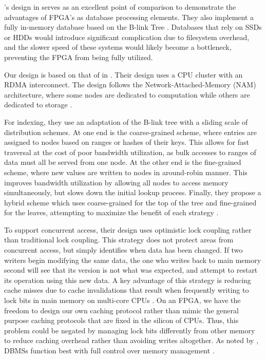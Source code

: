

\citeauthor{base}'s design in  serves as an excellent point of
comparison to demonstrate the advantages of FPGA's as database processing
elements. They also implement a fully in-memory database based on the B-link
Tree \autocite{base}. Databases that rely on SSDs or HDDs would introduce
significant complication due to filesystem overhead, and the slower speed of
these systems would likely become a bottleneck, preventing the FPGA from being
fully utilized.

Our design is based on that of \citeauthor{base} in . Their
design uses a CPU cluster with an RDMA interconnect. The design follows the
Network-Attached-Memory (NAM) architecture, where some nodes are dedicated to
computation while others are dedicated to storage
\autocite{base,binnig-vldb-2016}.

For indexing, they use an adaptation of the B-link tree with a sliding scale of
distribution schemes. At one end is the coarse-grained scheme, where entries are
assigned to nodes based on ranges or hashes of their keys. This allows for fast
traversal at the cost of poor bandwidth utilization, as bulk accesses to ranges
of data must all be served from one node. At the other end is the fine-grained
scheme, where new values are written to nodes in around-robin manner. This
improves bandwidth utilization by allowing all nodes to access memory
simultaneously, but slows down the initial lookup process. Finally, they propose
a hybrid scheme which uses coarse-grained for the top of the tree and
fine-grained for the leaves, attempting to maximize the benefit of each strategy
\autocite{base}.

To support concurrent access, their design uses optimistic lock coupling rather
than traditional lock coupling. This strategy does not protect areas from
concurrent access, but simply identifies when data has been changed. If two
writers begin modifying the same data, the one who writes back to main memory
second will see that its version is not what was expected, and attempt to
restart its operation using this new data. A key advantage of this strategy is
reducing cache misses due to cache invalidations that result when frequently
writing to lock bits in main memory on multi-core CPUs
\autocite{leis-damon-2016}. On an FPGA, we have the freedom to design our own
caching protocol rather than mimic the general purpose caching protocols that
are fixed in the silicon of CPUs. Thus, this problem could be negated by
managing lock bits differently from other memory to reduce caching overhead
rather than avoiding writes altogether. As noted by
\citeauthor{binnig-vldb-2016}, DBMSs function best with full control over memory
management \autocite{binnig-vldb-2016}.


